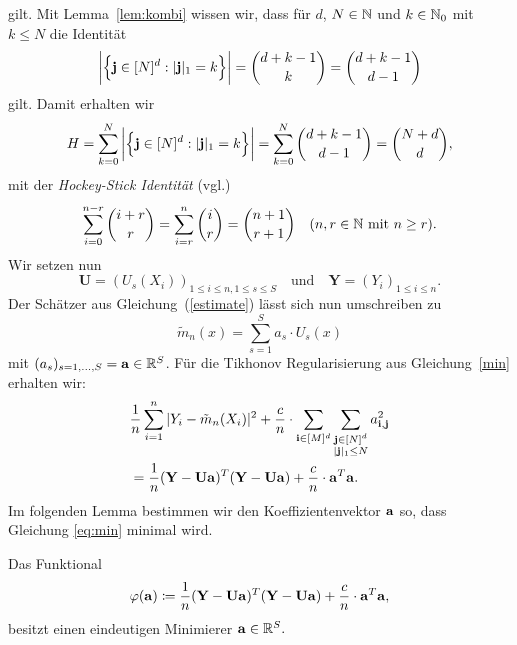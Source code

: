 gilt. Mit Lemma~\ref{lem:kombi} wissen wir, dass für $d$, $N \in \mathbb{N}$ und $k \in \mathbb{N}_0$ mit $k \leq N$ die Identität
$$\bigg|\Bigl\{\mathbf{j} \in [N]^d : |\mathbf{j}|_1 = k \Bigr\}\bigg| = \binom{d + k - 1}{k} = \binom{d + k - 1}{d - 1}$$ gilt.
Damit erhalten wir
$$H = \sum_{k = 0}^N \bigg|\Bigl\{\mathbf{j} \in [N]^d : |\mathbf{j}|_1 = k \Bigr\}\bigg|= \sum_{k = 0}^N \binom{d + k - 1}{d - 1} = \binom{N + d}{d},$$
mit der \emph{Hockey-Stick Identität} (vgl.\@ \cite[Theorem 10.14]{tollerproofs})
$$\sum_{i = 0}^{n-r} \binom{i + r}{r} = \sum_{i = r}^n \binom{i}{r} = \binom{n + 1}{r + 1} \quad (n, r \in \mathbb{N}  \text{ mit  } n \geq r).$$
Wir setzen nun 
$$ \mathbf{U} = (U_s(X_i))_{1\leq i \leq n,1\leq s \leq S} \quad \text{und} \quad \mathbf{Y} = (Y_i)_{1 \leq i \leq n}.$$
Der Schätzer aus Gleichung~(\ref{estimate}) lässt sich nun umschreiben zu 
\begin{equation}
\label{umschreiben}
\tilde{m}_n(x) = \sum_{s = 1}^S a_s \cdot U_s(x)
\end{equation}
mit $(a_s)_{s = 1,\dots,S} = \mathbf{a}\in \mathbb{R}^S$.
Für die Tikhonov Regularisierung aus Gleichung~\eqref{min} erhalten wir:
\begin{equation}
\label{eq:min}
\begin{split}
& \frac{1}{n} \sum_{i = 1}^n|Y_i - \tilde{m}_n(X_i)|^2 + \frac{c}{n} \cdot \sum_{\mathbf{i} \in [M]^d} \sum_{\substack{\mathbf{j} \in [N]^d\\|\mathbf{j}|_1 \leq N}} a_{\mathbf{i},\mathbf{j}}^2 \\
& = \frac{1}{n}(\mathbf{Y} - \mathbf{U}\mathbf{a})^T(\mathbf{Y} - \mathbf{U}\mathbf{a}) + \frac{c}{n} \cdot \mathbf{a}^T\mathbf{a}.
\end{split}
\end{equation}
Im folgenden Lemma bestimmen wir den Koeffizientenvektor $\mathbf{a}$ so, dass Gleichung \eqref{eq:min} minimal wird.
\begin{lem}
\label{mincoef}
Das Funktional 
$$
\varphi(\mathbf{a}) \coloneqq \frac{1}{n}(\mathbf{Y} - \mathbf{U}\mathbf{a})^T(\mathbf{Y} - \mathbf{U}\mathbf{a}) + \frac{c}{n} \cdot \mathbf{a}^T\mathbf{a},
$$
besitzt einen eindeutigen Minimierer $\mathbf{a} \in \mathbb{R}^S.$
\end{lem}
